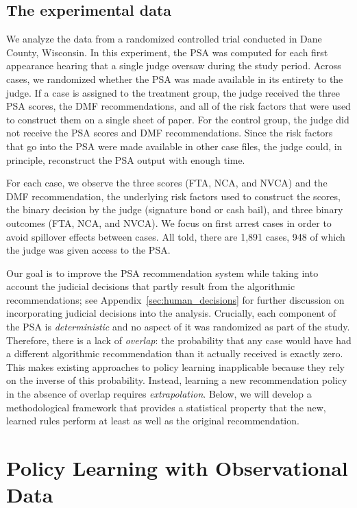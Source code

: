 \documentclass[12pt]{article}
\theoremstyle{definition}
\newcommand{\<}{\langle}
\renewcommand{\>}{\rangle}
\begin{document}
\subsection{The experimental data}

We analyze the data from a randomized controlled trial conducted in
Dane County, Wisconsin.  In this experiment, the PSA was computed for
each first appearance hearing that a single judge oversaw during the
study period.  Across cases, we randomized whether the PSA was made
available in its entirety to the judge.  If a case is assigned to the
treatment group, the judge received the three PSA scores, the DMF
recommendations, and all of the risk factors that were used to
construct them on a single sheet of paper.  For the control
group, the judge did not receive the PSA scores and DMF
recommendations. Since the risk factors that go into the PSA were
  made available in other case files, the judge could, in principle,
  reconstruct the PSA output with enough time.

For each case, we observe the three scores (FTA, NCA, and NVCA) and
the DMF recommendation, the underlying risk factors used to construct
the scores, the binary decision by the judge (signature bond or cash
bail), and three binary outcomes (FTA, NCA, and NVCA).  We focus on
first arrest cases in order to avoid spillover effects between
cases. All told, there are 1,891 cases, 948 of which the judge was
given access to the PSA.


Our goal is to improve the PSA recommendation system while
taking into account the judicial decisions that partly result from
the algorithmic recommendations; see
Appendix~\ref{sec:human_decisions} for further discussion on
incorporating judicial decisions into the analysis.  Crucially, each
component of the PSA is \emph{deterministic} and no aspect of it was
randomized as part of the study.  Therefore, there is a lack of
\emph{overlap}: the probability that any case would have had a
different algorithmic recommendation than it actually received is
exactly zero.  This makes existing approaches to policy learning
inapplicable because they rely on the inverse of this probability.
Instead, learning a new recommendation policy in the absence of
overlap requires \emph{extrapolation}.  Below, we will develop a
methodological framework that provides a statistical property that
the new, learned rules perform at least as well as the original
recommendation.



\section{Policy Learning with Observational Data}
\label{sec:methods}
\end{document}
